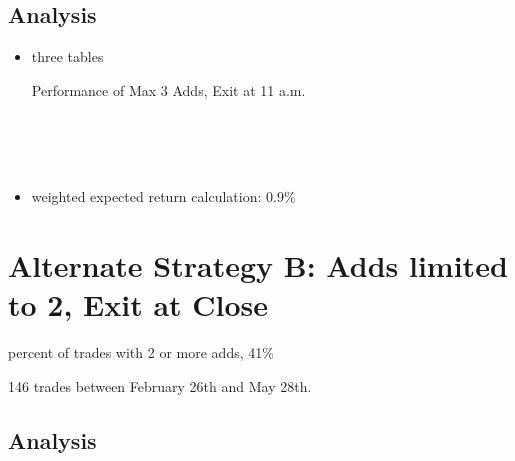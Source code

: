 \documentclass{article}
\begin{document}
\subsection{Analysis}

\begin{itemize}
	\item three tables
	
\begin{table}
\caption{Performance of Max 3 Adds, Exit at 11 a.m.}
\\[2ex]


\\[2ex]


\\[2ex]

\label{tab_strat_lim3}
\end{table}
	
	\item weighted expected return calculation: 0.9\%
\end{itemize}

\section{Alternate Strategy B: Adds limited to 2, Exit at Close}

percent of trades with 2 or more adds, 41\%

146 trades between February 26th and May 28th. 

\subsection{Analysis}
\end{document}
